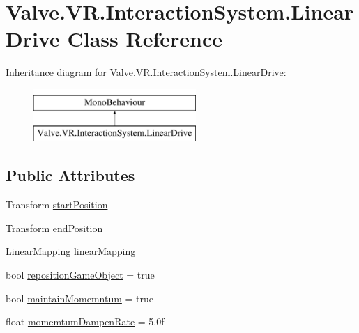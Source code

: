 \hypertarget{class_valve_1_1_v_r_1_1_interaction_system_1_1_linear_drive}{}\section{Valve.\+V\+R.\+Interaction\+System.\+Linear\+Drive Class Reference}
\label{class_valve_1_1_v_r_1_1_interaction_system_1_1_linear_drive}
Inheritance diagram for Valve.\+V\+R.\+Interaction\+System.\+Linear\+Drive\+:\begin{figure}[H]
\begin{center}
\leavevmode
\includegraphics[height=2.000000cm]{class_valve_1_1_v_r_1_1_interaction_system_1_1_linear_drive}
\end{center}
\end{figure}
\subsection*{Public Attributes}
\begin{DoxyCompactItemize}
\item 
Transform \mbox{\hyperlink{class_valve_1_1_v_r_1_1_interaction_system_1_1_linear_drive_ac9c2e3bc515634ca7a32e71b3ca75e1d}{start\+Position}}
\item 
Transform \mbox{\hyperlink{class_valve_1_1_v_r_1_1_interaction_system_1_1_linear_drive_a20ea9b3f558f3b5121a22bafb3926712}{end\+Position}}
\item 
\mbox{\hyperlink{class_valve_1_1_v_r_1_1_interaction_system_1_1_linear_mapping}{Linear\+Mapping}} \mbox{\hyperlink{class_valve_1_1_v_r_1_1_interaction_system_1_1_linear_drive_a60de56cbd429c31a845f0e7926a5bbea}{linear\+Mapping}}
\item 
bool \mbox{\hyperlink{class_valve_1_1_v_r_1_1_interaction_system_1_1_linear_drive_a4910e742976410f85591cba95f469deb}{reposition\+Game\+Object}} = true
\item 
bool \mbox{\hyperlink{class_valve_1_1_v_r_1_1_interaction_system_1_1_linear_drive_a4acb30750b4abe62e6a9e527cef3d015}{maintain\+Momemntum}} = true
\item 
float \mbox{\hyperlink{class_valve_1_1_v_r_1_1_interaction_system_1_1_linear_drive_a9fbb97e7e809a2b521ff3a84d92d3b93}{momemtum\+Dampen\+Rate}} = 5.\+0f
\end{DoxyCompactItemize}
